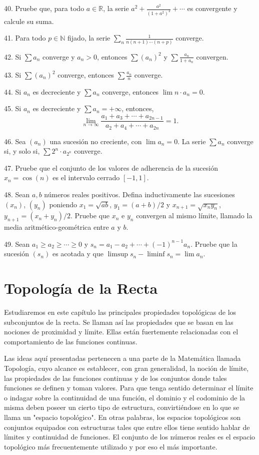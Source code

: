 \documentclass[12pt,oneside]{book}
\begin{document}
40. Pruebe que, para todo \(a \in \mathbb{R}\), la serie \(a^2 + \frac{a^2}{(1+a^2)^2} + \cdots\) es convergente y calcule su suma.

41. Para todo \(p \in \mathbb{N}\) fijado, la serie \(\sum_n \frac{1}{n(n+1)\cdots(n+p)}\) converge.

42. Si \(\sum a_n\) converge y \(a_n > 0\), entonces \(\sum (a_n)^2\) y \(\sum \frac{a_n}{1+a_n}\) convergen.

43. Si \(\sum (a_n)^2\) converge, entonces \(\sum \frac{a_n}{n}\) converge.

44. Si \(a_n\) es decreciente y \(\sum a_n\) converge, entonces \(\lim n \cdot a_n = 0\).

45. Si \(a_n\) es decreciente y \(\sum a_n = +\infty\), entonces,
\[
\lim_{n \to \infty} \frac{a_1 + a_3 + \cdots + a_{2n-1}}{a_2 + a_4 + \cdots + a_{2n}} = 1.
\]

46. Sea \((a_n)\) una sucesión no creciente, con \(\lim a_n = 0\). La serie \(\sum a_n\) converge si, y solo si, \(\sum 2^n \cdot a_{2^n}\) converge.

47. Pruebe que el conjunto de los valores de adherencia de la sucesión \(x_n = \cos(n)\) es el intervalo cerrado \([-1, 1]\).

48. Sean \(a, b\) números reales positivos. Defina inductivamente las sucesiones \((x_n)\), \((y_n)\) poniendo \(x_1 = \sqrt{ab}\), \(y_1 = (a+b)/2\) y \(x_{n+1} = \sqrt{x_n y_n}\), \(y_{n+1} = (x_n + y_n)/2\). Pruebe que \(x_n\) e \(y_n\) convergen al mismo límite, llamado la media aritmético-geométrica entre \(a\) y \(b\).

49. Sean \(a_1 \geq a_2 \geq \cdots \geq 0\) y \(s_n = a_1 - a_2 + \cdots + (-1)^{n-1} a_n\). Pruebe que la sucesión \((s_n)\) es acotada y que \(\limsup s_n - \liminf s_n = \lim a_n\).

\newpage

\chapter{Topología de la Recta}

Estudiaremos en este capítulo las principales propiedades topológicas de los subconjuntos de la recta. Se llaman así las propiedades que se basan en las nociones de proximidad y límite. Ellas están fuertemente relacionadas con el comportamiento de las funciones continuas.

Las ideas aquí presentadas pertenecen a una parte de la Matemática llamada Topología, cuyo alcance es establecer, con gran generalidad, la noción de límite, las propiedades de las funciones continuas y de los conjuntos donde tales funciones se definen y toman valores. Para que tenga sentido determinar el límite o indagar sobre la continuidad de una función, el dominio y el codominio de la misma deben poseer un cierto tipo de estructura, convirtiéndose en lo que se llama un "espacio topológico". En otras palabras, los espacios topológicos son conjuntos equipados con estructuras tales que entre ellos tiene sentido hablar de límites y continuidad de funciones. El conjunto de los números reales es el espacio topológico más frecuentemente utilizado y por eso el más importante.
\end{document}
